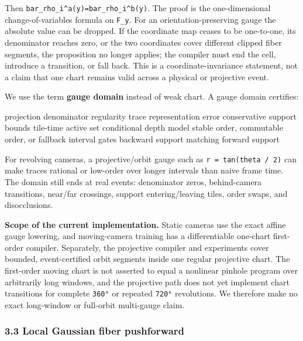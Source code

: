 \documentclass[
]{article}
\newenvironment{Shaded}{}{}
\newcommand{\NormalTok}[1]{#1}
\begin{document}
Then \texttt{bar\_rho\_i\^{}a(y)=bar\_rho\_i\^{}b(y)}. The proof is the
one-dimensional change-of-variables formula on \texttt{F\_y}. For an
orientation-preserving gauge the absolute value can be dropped. If the
coordinate map ceases to be one-to-one, its denominator reaches zero, or
the two coordinates cover different clipped fiber segments, the
proposition no longer applies; the compiler must end the cell, introduce
a transition, or fall back. This is a coordinate-invariance statement,
not a claim that one chart remains valid across a physical or projective
event.

We use the term \textbf{gauge domain} instead of weak chart. A gauge
domain certifies:

\begin{Shaded}
\begin{Highlighting}[]
\NormalTok{projection denominator regularity}
\NormalTok{trace representation error}
\NormalTok{conservative support bounds}
\NormalTok{tile{-}time active set}
\NormalTok{conditional depth model}
\NormalTok{stable order, commutable order, or fallback}
\NormalTok{interval gates}
\NormalTok{backward support matching forward support}
\end{Highlighting}
\end{Shaded}

For revolving cameras, a projective/orbit gauge such as
\texttt{r\ =\ tan(theta\ /\ 2)} can make traces rational or low-order
over longer intervals than naive frame time. The domain still ends at
real events: denominator zeros, behind-camera transitions, near/far
crossings, support entering/leaving tiles, order swaps, and
disocclusions.

\textbf{Scope of the current implementation.} Static cameras use the
exact affine gauge lowering, and moving-camera training has a
differentiable one-chart first-order compiler. Separately, the
projective compiler and experiments cover bounded, event-certified orbit
segments inside one regular projective chart. The first-order moving
chart is not asserted to equal a nonlinear pinhole program over
arbitrarily long windows, and the projective path does not yet implement
chart transitions for complete \texttt{360°} or repeated \texttt{720°}
revolutions. We therefore make no exact long-window or full-orbit
multi-gauge claim.

\subsubsection{3.3 Local Gaussian fiber
pushforward}\label{local-gaussian-fiber-pushforward}
\end{document}

